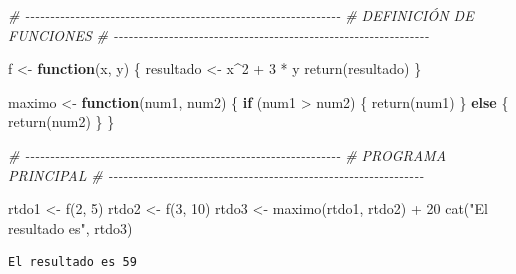 \documentclass[
]{book}
\newenvironment{Shaded}{\begin{snugshade}}{\end{snugshade}}
\newcommand{\CommentTok}[1]{\textcolor[rgb]{0.56,0.35,0.01}{\textit{#1}}}
\newcommand{\ControlFlowTok}[1]{\textcolor[rgb]{0.13,0.29,0.53}{\textbf{#1}}}
\newcommand{\DecValTok}[1]{\textcolor[rgb]{0.00,0.00,0.81}{#1}}
\newcommand{\FunctionTok}[1]{\textcolor[rgb]{0.00,0.00,0.00}{#1}}
\newcommand{\NormalTok}[1]{#1}
\newcommand{\OtherTok}[1]{\textcolor[rgb]{0.56,0.35,0.01}{#1}}
\newcommand{\SpecialCharTok}[1]{\textcolor[rgb]{0.00,0.00,0.00}{#1}}
\newcommand{\StringTok}[1]{\textcolor[rgb]{0.31,0.60,0.02}{#1}}
\begin{document}
\begin{Shaded}
\begin{Highlighting}[]
\CommentTok{\# {-}{-}{-}{-}{-}{-}{-}{-}{-}{-}{-}{-}{-}{-}{-}{-}{-}{-}{-}{-}{-}{-}{-}{-}{-}{-}{-}{-}{-}{-}{-}{-}{-}{-}{-}{-}{-}{-}{-}{-}{-}{-}{-}{-}{-}{-}{-}{-}{-}{-}{-}{-}{-}{-}{-}{-}{-}{-}{-}{-}{-}{-}{-}}
\CommentTok{\# DEFINICIÓN DE FUNCIONES}
\CommentTok{\# {-}{-}{-}{-}{-}{-}{-}{-}{-}{-}{-}{-}{-}{-}{-}{-}{-}{-}{-}{-}{-}{-}{-}{-}{-}{-}{-}{-}{-}{-}{-}{-}{-}{-}{-}{-}{-}{-}{-}{-}{-}{-}{-}{-}{-}{-}{-}{-}{-}{-}{-}{-}{-}{-}{-}{-}{-}{-}{-}{-}{-}{-}{-}}

\NormalTok{f }\OtherTok{\textless{}{-}} \ControlFlowTok{function}\NormalTok{(x, y) \{}
\NormalTok{    resultado }\OtherTok{\textless{}{-}}\NormalTok{ x}\SpecialCharTok{\^{}}\DecValTok{2} \SpecialCharTok{+} \DecValTok{3} \SpecialCharTok{*}\NormalTok{ y}
    \FunctionTok{return}\NormalTok{(resultado)}
\NormalTok{\}}

\NormalTok{maximo }\OtherTok{\textless{}{-}} \ControlFlowTok{function}\NormalTok{(num1, num2) \{}
    \ControlFlowTok{if}\NormalTok{ (num1 }\SpecialCharTok{\textgreater{}}\NormalTok{ num2) \{}
        \FunctionTok{return}\NormalTok{(num1)}
\NormalTok{    \} }\ControlFlowTok{else}\NormalTok{ \{}
        \FunctionTok{return}\NormalTok{(num2)}
\NormalTok{    \}}
\NormalTok{\}}

\CommentTok{\# {-}{-}{-}{-}{-}{-}{-}{-}{-}{-}{-}{-}{-}{-}{-}{-}{-}{-}{-}{-}{-}{-}{-}{-}{-}{-}{-}{-}{-}{-}{-}{-}{-}{-}{-}{-}{-}{-}{-}{-}{-}{-}{-}{-}{-}{-}{-}{-}{-}{-}{-}{-}{-}{-}{-}{-}{-}{-}{-}{-}{-}{-}{-}}
\CommentTok{\# PROGRAMA PRINCIPAL}
\CommentTok{\# {-}{-}{-}{-}{-}{-}{-}{-}{-}{-}{-}{-}{-}{-}{-}{-}{-}{-}{-}{-}{-}{-}{-}{-}{-}{-}{-}{-}{-}{-}{-}{-}{-}{-}{-}{-}{-}{-}{-}{-}{-}{-}{-}{-}{-}{-}{-}{-}{-}{-}{-}{-}{-}{-}{-}{-}{-}{-}{-}{-}{-}{-}{-}}

\NormalTok{rtdo1 }\OtherTok{\textless{}{-}} \FunctionTok{f}\NormalTok{(}\DecValTok{2}\NormalTok{, }\DecValTok{5}\NormalTok{)}
\NormalTok{rtdo2 }\OtherTok{\textless{}{-}} \FunctionTok{f}\NormalTok{(}\DecValTok{3}\NormalTok{, }\DecValTok{10}\NormalTok{)}
\NormalTok{rtdo3 }\OtherTok{\textless{}{-}} \FunctionTok{maximo}\NormalTok{(rtdo1, rtdo2) }\SpecialCharTok{+} \DecValTok{20}
\FunctionTok{cat}\NormalTok{(}\StringTok{"El resultado es"}\NormalTok{, rtdo3)}
\end{Highlighting}
\end{Shaded}

\begin{verbatim}
El resultado es 59
\end{verbatim}
\end{document}
